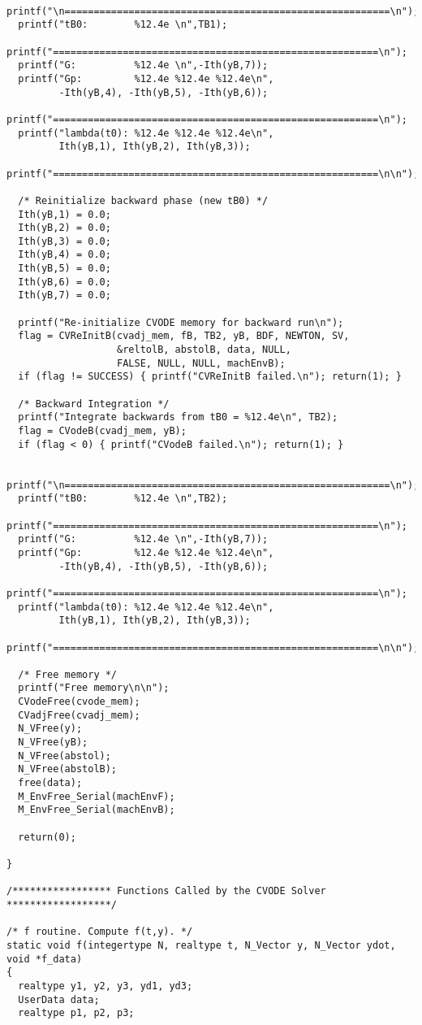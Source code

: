 \begin{verbatim}
  printf("\n========================================================\n");
  printf("tB0:        %12.4e \n",TB1);
  printf("========================================================\n");
  printf("G:          %12.4e \n",-Ith(yB,7));
  printf("Gp:         %12.4e %12.4e %12.4e\n", 
         -Ith(yB,4), -Ith(yB,5), -Ith(yB,6));
  printf("========================================================\n");
  printf("lambda(t0): %12.4e %12.4e %12.4e\n", 
         Ith(yB,1), Ith(yB,2), Ith(yB,3));
  printf("========================================================\n\n");

  /* Reinitialize backward phase (new tB0) */
  Ith(yB,1) = 0.0;
  Ith(yB,2) = 0.0;
  Ith(yB,3) = 0.0;
  Ith(yB,4) = 0.0;
  Ith(yB,5) = 0.0;
  Ith(yB,6) = 0.0;
  Ith(yB,7) = 0.0;

  printf("Re-initialize CVODE memory for backward run\n");
  flag = CVReInitB(cvadj_mem, fB, TB2, yB, BDF, NEWTON, SV, 
                   &reltolB, abstolB, data, NULL, 
                   FALSE, NULL, NULL, machEnvB);
  if (flag != SUCCESS) { printf("CVReInitB failed.\n"); return(1); }

  /* Backward Integration */
  printf("Integrate backwards from tB0 = %12.4e\n", TB2);
  flag = CVodeB(cvadj_mem, yB);
  if (flag < 0) { printf("CVodeB failed.\n"); return(1); }

  printf("\n========================================================\n");
  printf("tB0:        %12.4e \n",TB2);
  printf("========================================================\n");
  printf("G:          %12.4e \n",-Ith(yB,7));
  printf("Gp:         %12.4e %12.4e %12.4e\n", 
         -Ith(yB,4), -Ith(yB,5), -Ith(yB,6));
  printf("========================================================\n");
  printf("lambda(t0): %12.4e %12.4e %12.4e\n", 
         Ith(yB,1), Ith(yB,2), Ith(yB,3));
  printf("========================================================\n\n");

  /* Free memory */
  printf("Free memory\n\n");
  CVodeFree(cvode_mem);
  CVadjFree(cvadj_mem);
  N_VFree(y);
  N_VFree(yB);
  N_VFree(abstol);
  N_VFree(abstolB);
  free(data);
  M_EnvFree_Serial(machEnvF);
  M_EnvFree_Serial(machEnvB);

  return(0);

}

/***************** Functions Called by the CVODE Solver ******************/

/* f routine. Compute f(t,y). */
static void f(integertype N, realtype t, N_Vector y, N_Vector ydot, void *f_data)
{
  realtype y1, y2, y3, yd1, yd3;
  UserData data;
  realtype p1, p2, p3;


\end{verbatim}
